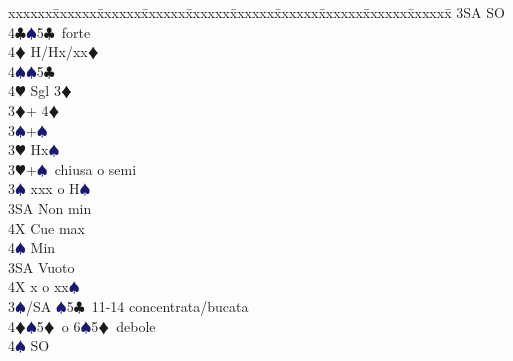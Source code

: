 \documentclass[a4paper,italian]{article}
\newcommand{\BC}{\textcolor{OliveGreen}{$\clubsuit$}}
\newcommand{\BD}{\textcolor{RedOrange}{$\vardiamondsuit$}}
\newcommand{\BH}{\textcolor{Red2}{$\varheartsuit${}}}
\newcommand{\BS}{\textcolor{MidnightBlue}{$\spadesuit${}}}
\newenvironment{bidtable}
{\begin{tabbing}

    xxxxxx\=xxxxxx\=xxxxxx\=xxxxxx\=xxxxxx\=xxxxxx\=xxxxxx\=xxxxxx\=xxxxxx\=xxxxxx\=\kill}
{\end{tabbing} }%
\begin{document}
\begin{multicols}{2}
\begin{bidtable}
                                            3SA \> SO\\
                                            4\BC {}\BS 5\BC\ forte\\
                                            4\BD \> H/Hx/xx\BD \\
                                            4\BS {}\BS 5\BC \\
                                            4\BH \> Sgl 3\BD \-\-\\
                                            3\BD {}+ 4\BD \+\\
                                            3\BS {}+\BS \\
                                            3\BH \> Hx\BS \-\\
                                            3\BH {}+\BS\ chiusa o semi\+\\
                                            3\BS \> xxx o H\BS \+\\
                                            3SA \> Non min\\
                                            4X \> Cue max\\
                                            4\BS\> Min\-\\
                                            3SA \> Vuoto\\
                                            4X \> x o xx\BS \-\\
                                            3\BS/SA \BS 5\BC\ 11-14 concentrata/bucata\\
                                            4\BD {}\BS5\BD\ o 6\BS5\BD\ debole\+\\
                                            4\BS \> SO
                                        \end{bidtable}
                                    \end{multicols}
                                    \newpage
\end{document}
